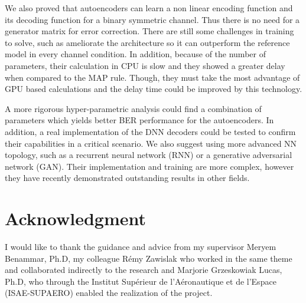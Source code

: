 \documentclass[conference]{IEEEtran}
\begin{document}
We also proved that autoencoders can learn a non linear encoding function and its decoding function for a binary symmetric channel. Thus there is no need for a generator matrix for error correction. There are still some challenges in training to solve, such as ameliorate the architecture so it can outperform the reference model in every channel condition. In addition, because of the number of parameters, their calculation in CPU is slow and they showed a greater delay when compared to the MAP rule. Though, they must take the most advantage of GPU based calculations and the delay time could be improved by this technology.

A more rigorous hyper-parametric analysis could find a combination of parameters which yields better BER performance for the autoencoders. In addition, a real implementation of the DNN decoders could be tested to confirm their capabilities in a critical scenario. We also suggest using more advanced NN topology, such as a recurrent neural network (RNN) or a generative adversarial network (GAN). Their implementation and training are more complex, however they have recently demonstrated outstanding results in other fields.

\section*{Acknowledgment}

I would like to thank the guidance and advice from my supervisor Meryem Benammar, Ph.D, my colleague Rémy Zawislak who worked in the same theme and collaborated indirectly to the research and Marjorie Grzeskowiak Lucas, Ph.D, who through the Institut Supérieur de l'Aéronautique et de l'Espace (ISAE-SUPAERO) enabled the realization of the project.





\end{document}
